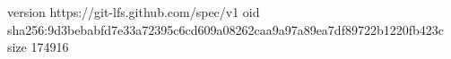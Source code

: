 version https://git-lfs.github.com/spec/v1
oid sha256:9d3bebabfd7e33a72395c6cd609a08262caa9a97a89ea7df89722b1220fb423c
size 174916

